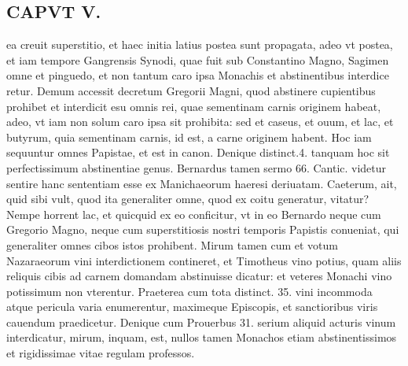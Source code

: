 \documentclass{article}
\begin{document}
\begin{pages}
\section*{CAPVT  V. }
\marginpar{[ p.879 ]}\pstart ea creuit superstitio, et haec initia latius postea sunt propagata, adeo vt postea, et iam tempore Gangrensis Synodi, quae fuit sub Constantino Magno, Sagimen omne et pinguedo, et non tantum caro ipsa Monachis et abstinentibus interdice retur. Demum accessit decretum Gregorii Magni, quod abstinere cupientibus prohibet et interdicit esu omnis rei, quae sementinam carnis originem habeat, adeo, vt iam non solum caro ipsa sit prohibita: sed et caseus, et ouum, et lac, et butyrum, quia sementinam carnis, id est, a carne originem habent. Hoc iam sequuntur omnes Papistae, et est in canon. Denique distinct.4. tanquam hoc sit perfectissimum abstinentiae genus. Bernardus tamen sermo 66. Cantic. videtur sentire hanc sententiam esse ex Manichaeorum haeresi deriuatam. Caeterum, ait, quid sibi vult, quod ita generaliter omne, quod ex coitu generatur, vitatur? Nempe horrent lac, et quicquid ex eo conficitur, vt in eo Bernardo neque cum Gregorio Magno, neque cum superstitiosis nostri temporis Papistis conueniat, qui generaliter omnes cibos istos prohibent. Mirum tamen cum et votum Nazaraeorum vini interdictionem contineret, et Timotheus vino potius, quam aliis reliquis cibis ad carnem domandam abstinuisse dicatur: et veteres Monachi vino potissimum non vterentur. Praeterea cum tota distinct. 35. vini incommoda atque pericula varia enumerentur, maximeque Episcopis, et sanctioribus viris cauendum praedicetur. Denique cum Prouerbus 31. serium aliquid acturis vinum interdicatur, mirum, inquam, est, nullos tamen Monachos etiam abstinentissimos et rigidissimae vitae regulam professos.  \pend

\end{pages}
\end{document}
